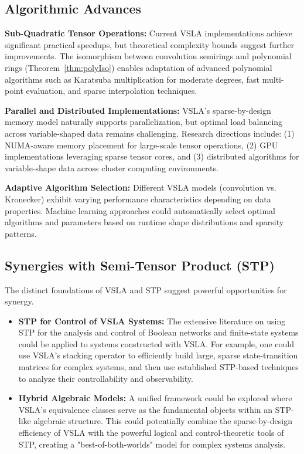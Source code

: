 \subsection{Algorithmic Advances}

\textbf{Sub-Quadratic Tensor Operations:} Current VSLA implementations achieve significant practical speedups, but theoretical complexity bounds suggest further improvements. The isomorphism between convolution semirings and polynomial rings (Theorem~\ref{thm:polyIso}) enables adaptation of advanced polynomial algorithms such as Karatsuba multiplication for moderate degrees, fast multi-point evaluation, and sparse interpolation techniques.

\textbf{Parallel and Distributed Implementations:} VSLA's sparse-by-design memory model naturally supports parallelization, but optimal load balancing across variable-shaped data remains challenging. Research directions include: (1) NUMA-aware memory placement for large-scale tensor operations, (2) GPU implementations leveraging sparse tensor cores, and (3) distributed algorithms for variable-shape data across cluster computing environments.

\textbf{Adaptive Algorithm Selection:} Different VSLA models (convolution vs. Kronecker) exhibit varying performance characteristics depending on data properties. Machine learning approaches could automatically select optimal algorithms and parameters based on runtime shape distributions and sparsity patterns.

\subsection{Synergies with Semi-Tensor Product (STP)}
The distinct foundations of VSLA and STP suggest powerful opportunities for synergy.
\begin{itemize}
    \item \textbf{STP for Control of VSLA Systems:} The extensive literature on using STP for the analysis and control of Boolean networks and finite-state systems \cite{Cheng2011} could be applied to systems constructed with VSLA. For example, one could use VSLA's stacking operator to efficiently build large, sparse state-transition matrices for complex systems, and then use established STP-based techniques to analyze their controllability and observability.
    \item \textbf{Hybrid Algebraic Models:} A unified framework could be explored where VSLA's equivalence classes serve as the fundamental objects within an STP-like algebraic structure. This could potentially combine the sparse-by-design efficiency of VSLA with the powerful logical and control-theoretic tools of STP, creating a "best-of-both-worlds" model for complex systems analysis.
\end{itemize}

